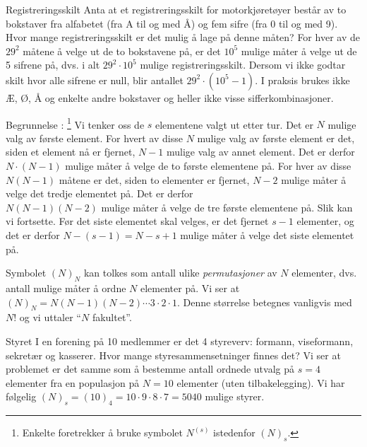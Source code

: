 \begin{eksempel}{Registreringsskilt}
Anta at et registreringsskilt for motorkjøretøyer består av to
bokstaver fra alfabetet (fra A til og med Å) og fem sifre (fra 0
til og med 9). Hvor mange registreringsskilt er det mulig å lage
på denne måten? For hver av de $29^2$ måtene å velge ut de to
bokstavene på, er det $10^5$ mulige måter å velge ut de 5 sifrene
på, dvs. i alt $29^2 \cdot 10^5$ mulige registreringsskilt.
Dersom vi ikke godtar skilt hvor alle sifrene er null, blir
antallet $29^2 \cdot (10^5-1)$. I praksis brukes ikke Æ, Ø, Å 
og enkelte andre bokstaver og heller ikke visse sifferkombinasjoner.
\end{eksempel}
\begin{center}  \end{center}
\noindent Begrunnelse :
 \footnote{Enkelte foretrekker å bruke symbolet $N^{(s)}$
 istedenfor $(N)_s$.}
Vi tenker oss de $s$ elementene valgt ut etter tur.
Det er $N$ mulige valg av første element. For hvert av disse $N$
mulige valg av første element er det, siden et element nå er
fjernet, $N-1$ mulige valg av annet element. Det er derfor 
$N \cdot (N-1)$ mulige måter å velge de to første elementene på. For
hver av disse $N(N-1)$ måtene er det, siden to elementer er
fjernet, $N-2$ mulige måter å velge det tredje elementet på. Det
er derfor \\
$N(N-1)(N-2)$ mulige måter å velge de tre første
elementene på. Slik kan vi fortsette. Før det siste elementet
skal velges, er det fjernet $s-1$ elementer, og det er derfor $N-
(s-1)=N-s+1$ mulige måter å velge det siste elementet på.

Symbolet $(N)_N$ kan tolkes som antall ulike {\em permutasjoner}
av $N$ elementer, dvs. antall mulige måter å ordne $N$ elementer
på. Vi ser at $(N)_N=N(N-1)(N-2)\cdots 3\cdot 2\cdot 1$. Denne
størrelse betegnes vanligvis med $N$! og vi uttaler ``$N$
fakultet''. \\


\begin{eksempel}{Styret}
I en forening på 10 medlemmer er det 4 styreverv: formann,
viseformann, sekretær og kasserer. Hvor mange
styresammensetninger finnes det? Vi ser at problemet er det samme
som å bestemme antall ordnede utvalg på $s=4$ elementer fra en
populasjon på $N=10$ elementer (uten tilbakelegging). Vi har
følgelig $(N)_s=(10)_4=10\cdot 9\cdot 8\cdot 7 =5040$ mulige
styrer.
\end{eksempel}

